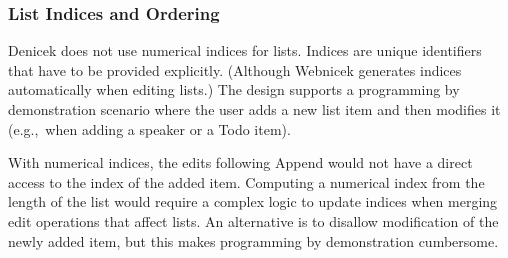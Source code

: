 \documentclass[sigconf]{acmart}
\newcommand{\note}[1]{}
\newcommand{\ident}[1]{{\sffamily #1}}
\begin{document}
\subsubsection*{List Indices and Ordering}
Denicek does not use numerical indices for lists. Indices are unique identifiers that have to
be provided explicitly. (Although Webnicek generates indices automatically when editing lists.)
The design supports a programming by demonstration scenario where the user adds a new list item
and then modifies it (e.g.,~when adding a speaker or a Todo item).

With numerical indices, the edits following \ident{Append} would not have a direct access to the
index of the added item. Computing a numerical index from the length of the list would require
a complex logic to update indices when merging edit operations that affect lists. An alternative
is to disallow modification of the newly added item, but this makes programming by demonstration
cumbersome.

%
%
\end{document}
